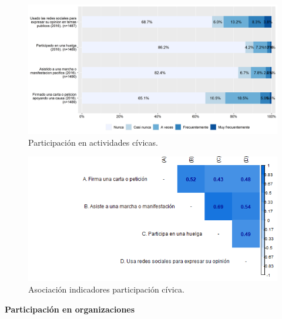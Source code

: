 \documentclass[
  12pt,
]{book}
\begin{document}
\begin{figure}[H]

{\centering \includegraphics[width=1\linewidth,height=1\textheight]{output/graphs/participacion-civica} 

}

\caption{Participación en actividades cívicas.}\label{fig:participacion-civica}
\end{figure}

\begin{figure}[H]

{\centering \includegraphics[width=1\linewidth,height=1\textheight]{output/graphs/participacion-civica_cor} 

}

\caption{Asociación indicadores participación cívica.}\label{fig:participacion-civica-cor}
\end{figure}

\textbf{Participación en organizaciones}
\end{document}
